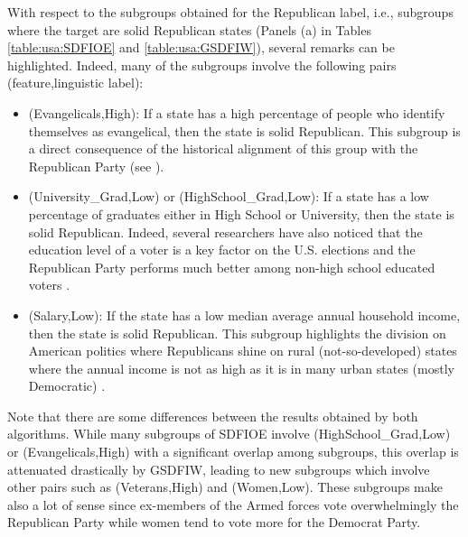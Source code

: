 With respect to the subgroups obtained for the Republican label, i.e., subgroups where the target are solid Republican states (Panels (a) in Tables \ref{table:usa:SDFIOE} and \ref{table:usa:GSDFIW}), several remarks can be 
highlighted. Indeed, many of the subgroups involve the following pairs (feature,linguistic label):
\begin{itemize}
	\item (Evangelicals,High): If a state has a high percentage of people who identify themselves as evangelical, then the state is solid Republican. This subgroup is a direct consequence of the historical alignment of this group with the Republican Party (see \cite{pewresearch,Schwadel2017}).
	\item (University\_Grad,Low) or (HighSchool\_Grad,Low): If a state has a low percentage of graduates either in High School or University, then the state is solid Republican. Indeed, several researchers have also noticed that the education level of a voter is a key factor on the U.S. elections and the Republican Party performs much better among non-high school educated voters \cite{Harris2018}.
	\item (Salary,Low): If the state has a low median average annual household income, then the state is solid Republican. This subgroup highlights the division on American politics where Republicans shine on rural (not-so-developed) states where the annual income is not as high as it is in many urban states (mostly Democratic) \cite{Molinaro2021}.
\end{itemize}
Note that there are some differences between the results obtained by both algorithms. While many subgroups of SDFIOE involve (HighSchool\_Grad,Low) or (Evangelicals,High) with a significant overlap among subgroups, this overlap is attenuated drastically by GSDFIW, leading to new subgroups which involve other pairs such as (Veterans,High) and (Women,Low). These subgroups make also a lot of sense since ex-members of the Armed forces vote overwhelmingly the Republican Party while women tend to vote more for the Democrat Party.

